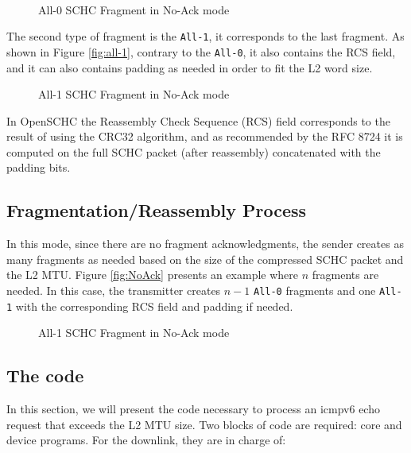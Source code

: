 ~

\begin{figure}[!ht] 
    \centering 
    
    \caption{All-0 SCHC Fragment in No-Ack mode} 
    \label{fig-all-0} 
\end{figure} 

The second type of fragment is the \texttt{All-1}, it corresponds to the last fragment. As shown in Figure \ref{fig:all-1}, contrary to the \texttt{All-0}, it also contains the RCS field, and it can also contains padding as needed in order to fit the L2 word size.

\begin{figure}[!ht] 
    \centering 
    
    \caption{All-1 SCHC Fragment in No-Ack mode} 
    \label{fig-all-1} 
\end{figure} 
   
In OpenSCHC the Reassembly Check Sequence (RCS) field corresponds to the result of using the CRC32 algorithm, and as recommended by the RFC 8724 it is computed on the full SCHC packet (after reassembly) concatenated with the padding bits.

\subsection{Fragmentation/Reassembly Process}

In this mode, since there are no fragment acknowledgments, the sender creates as many fragments as needed based on the size of the compressed SCHC packet and the L2 MTU.
Figure \ref{fig:NoAck} presents an example where $n$ fragments are needed. 
In this case, the transmitter creates $n-1$ \texttt{All-0} fragments and one \texttt{All-1} with the corresponding RCS field and padding if needed.

\begin{figure}[!ht] 
    \centering 
    
    \caption{All-1 SCHC Fragment in No-Ack mode} 
    \label{fig-NoAck} 
\end{figure} 

\subsection{The code}

In this section, we will present the code necessary to process an icmpv6 echo request that exceeds the L2 MTU size. 
Two blocks of code are required: core and device programs. 
For the downlink, they are in charge of: 


